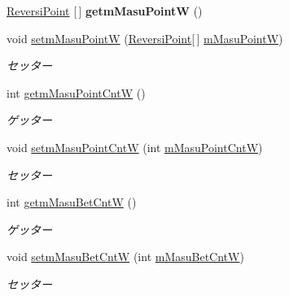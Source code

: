 \begin{DoxyCompactItemize}
\hyperlink{classjp_1_1gr_1_1java__conf_1_1yuta__yoshinaga_1_1reversi_1_1model_1_1_reversi_point}{Reversi\+Point} \mbox{[}$\,$\mbox{]} {\bfseries getm\+Masu\+PointW} ()
\item 
void \hyperlink{classjp_1_1gr_1_1java__conf_1_1yuta__yoshinaga_1_1reversi_1_1model_1_1_reversi_a3c7a1dfd53c9d84e23bb7c9895657261}{setm\+Masu\+PointW} (\hyperlink{classjp_1_1gr_1_1java__conf_1_1yuta__yoshinaga_1_1reversi_1_1model_1_1_reversi_point}{Reversi\+Point}\mbox{[}$\,$\mbox{]} \hyperlink{classjp_1_1gr_1_1java__conf_1_1yuta__yoshinaga_1_1reversi_1_1model_1_1_reversi_a254c60242b0c2e4c4ffc4b211bb5794b}{m\+Masu\+PointW})
\begin{DoxyCompactList}\small\item\em セッター \end{DoxyCompactList}\item 
int \hyperlink{classjp_1_1gr_1_1java__conf_1_1yuta__yoshinaga_1_1reversi_1_1model_1_1_reversi_a4a8980c09fba0b53d19efd195f66338e}{getm\+Masu\+Point\+CntW} ()
\begin{DoxyCompactList}\small\item\em ゲッター \end{DoxyCompactList}\item 
void \hyperlink{classjp_1_1gr_1_1java__conf_1_1yuta__yoshinaga_1_1reversi_1_1model_1_1_reversi_a8e7b9a30f340e7f146943f1abe042dfb}{setm\+Masu\+Point\+CntW} (int \hyperlink{classjp_1_1gr_1_1java__conf_1_1yuta__yoshinaga_1_1reversi_1_1model_1_1_reversi_a1aded4686b1a06aeacdadd99b9de3b4a}{m\+Masu\+Point\+CntW})
\begin{DoxyCompactList}\small\item\em セッター \end{DoxyCompactList}\item 
int \hyperlink{classjp_1_1gr_1_1java__conf_1_1yuta__yoshinaga_1_1reversi_1_1model_1_1_reversi_a0c8bd1c479d27a1531b99baa9af52fb6}{getm\+Masu\+Bet\+CntW} ()
\begin{DoxyCompactList}\small\item\em ゲッター \end{DoxyCompactList}\item 
void \hyperlink{classjp_1_1gr_1_1java__conf_1_1yuta__yoshinaga_1_1reversi_1_1model_1_1_reversi_a724353a0a5f9b262f50f930bf992cf1f}{setm\+Masu\+Bet\+CntW} (int \hyperlink{classjp_1_1gr_1_1java__conf_1_1yuta__yoshinaga_1_1reversi_1_1model_1_1_reversi_a4765b30bf4908b2dcddd364de61af8d0}{m\+Masu\+Bet\+CntW})
\begin{DoxyCompactList}\small\item\em セッター \end{DoxyCompactList}\item 

\end{DoxyCompactItemize}
